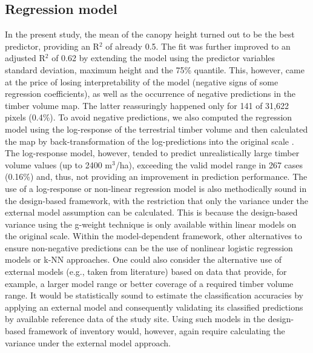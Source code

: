 \subsection{Regression model}
\label{sec:regmod}

In the present study, the mean of the canopy height turned out to be the best predictor, providing an R$^2$ of already 0.5. The fit was further improved to an adjusted R$^2$ of 0.62 by extending the model using the predictor variables standard deviation, maximum height and the 75\% quantile. This, however, came at the price of losing interpretability of the model (negative signs of some regression coefficients), as well as the occurrence of negative predictions in the timber volume map. The latter reassuringly happened only for 141 of 31,622 pixels (0.4\%). To avoid negative predictions, we also computed the regression model using the log-response of the terrestrial timber volume and then calculated the map by back-transformation of the log-predictions into the original scale \citep{beauchamp1973}. The log-response model, however, tended to predict unrealistically large timber volume values (up to 2400 m$^3$/ha), exceeding the valid model range in 267 cases (0.16\%) and, thus, not providing an improvement in prediction performance. The use of a log-response or non-linear regression model is also methodically sound in the design-based framework, with the restriction that only the variance under the external model assumption \citep{mandallaz2008} can be calculated. This is because the design-based variance using the g-weight technique \citep{mandallaz2013b, mandallaz2013a} is only available within linear models on the original scale. Within the model-dependent framework, other alternatives to ensure non-negative predictions can be the use of nonlinear logistic regression models \citep{mcroberts2013} or k-NN approaches. One could also consider the alternative use of external models (e.g., taken from literature) based on data that provide, for example, a larger model range or better coverage of a required timber volume range. It would be statistically sound to estimate the classification accuracies by applying an external model and consequently validating its classified predictions by available reference data of the study site. Using such models in the design-based framework of inventory would, however, again require calculating the variance under the external model approach.

